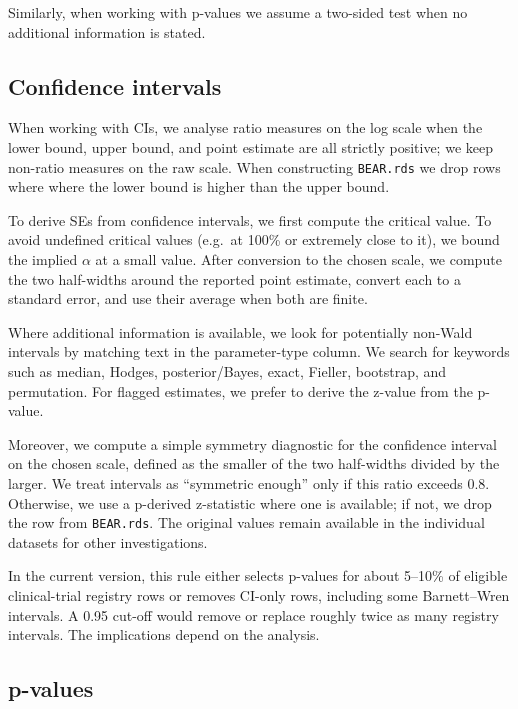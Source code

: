 \documentclass[
  11pt,
]{article}
\begin{document}
Similarly, when working with p-values we assume a two-sided test when no
additional information is stated.

\subsection{Confidence intervals}\label{confidence-intervals}

When working with CIs, we analyse ratio measures on the log scale when
the lower bound, upper bound, and point estimate are all strictly
positive; we keep non-ratio measures on the raw scale. When constructing
\texttt{BEAR.rds} we drop rows where where the lower bound is higher
than the upper bound.

To derive SEs from confidence intervals, we first compute the critical
value. To avoid undefined critical values (e.g.~at 100\% or extremely
close to it), we bound the implied \(\alpha\) at a small value. After
conversion to the chosen scale, we compute the two half-widths around
the reported point estimate, convert each to a standard error, and use
their average when both are finite.

Where additional information is available, we look for potentially
non-Wald intervals by matching text in the parameter-type column. We
search for keywords such as median, Hodges, posterior/Bayes, exact,
Fieller, bootstrap, and permutation. For flagged estimates, we prefer to
derive the z-value from the p-value.

Moreover, we compute a simple symmetry diagnostic for the confidence
interval on the chosen scale, defined as the smaller of the two
half-widths divided by the larger. We treat intervals as ``symmetric
enough'' only if this ratio exceeds 0.8. Otherwise, we use a p-derived
z-statistic where one is available; if not, we drop the row from
\texttt{BEAR.rds}. The original values remain available in the
individual datasets for other investigations.

In the current version, this rule either selects p-values for about
5--10\% of eligible clinical-trial registry rows or removes CI-only
rows, including some Barnett--Wren intervals. A 0.95 cut-off would
remove or replace roughly twice as many registry intervals. The
implications depend on the analysis.

\subsection{p-values}\label{p-values}
\end{document}
